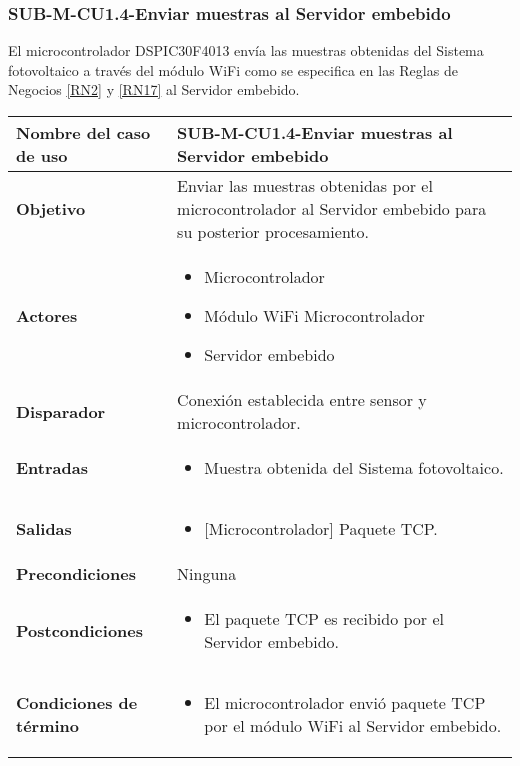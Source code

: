 \subsubsection{SUB-M-CU1.4-Enviar muestras al Servidor embebido}\label{SUB-M-CU1.4}
El microcontrolador DSPIC30F4013 envía las muestras obtenidas del Sistema fotovoltaico a través del módulo WiFi como se especifica en las Reglas de Negocios \ref{RN2} y \ref{RN17} al Servidor embebido.
\begin{longtable}{|J{5cm}|J{10.3cm}|}
	\hline
	\textbf{Nombre del caso de uso} &
		SUB-M-CU1.4-Enviar muestras al Servidor embebido \\ \hline
	\textbf{Objetivo} &
		Enviar las muestras obtenidas por el microcontrolador al Servidor embebido para su posterior procesamiento. \\ \hline
	\textbf{Actores} &
	    \begin{itemize}
		    \item Microcontrolador
		    \item Módulo WiFi Microcontrolador
		    \item Servidor embebido
		\end{itemize}\\ \hline 
	\textbf{Disparador} & 
		Conexión establecida entre sensor y microcontrolador.\\ \hline
	\textbf{Entradas} & %
		\begin{itemize}%
				\item Muestra obtenida del Sistema fotovoltaico.
		\end{itemize}
		\\ \hline 
	\textbf{Salidas} & 
	    \begin{itemize}%
	        \item {[Microcontrolador]} Paquete TCP.
	    \end{itemize}\\ \hline
	\textbf{Precondiciones} & Ninguna
		\\ \hline
	\textbf{Postcondiciones} &
		\begin{itemize}
			\item El paquete TCP es recibido por el Servidor embebido.
		\end{itemize} \\ \hline
	\textbf{Condiciones de término} & 
		\begin{itemize}
		    \item El microcontrolador envió paquete TCP por el módulo WiFi al Servidor embebido.

\end{itemize}
\end{longtable}
